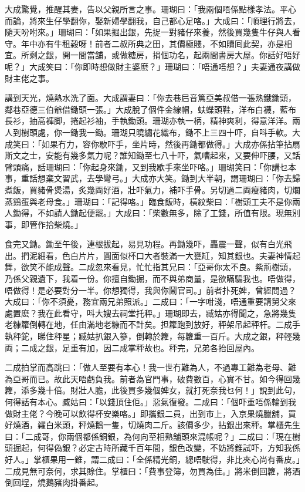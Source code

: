 \documentclass[a5paper, 12pt, openany]{book} %
\begin{document}
	大成驚覺，推醒其妻，告以父親所言之事。珊瑚曰：「我兩個唔係點樣孝法。平心而論，將來生仔學翻你，娶新婦學翻我，自己都心足咯。」大成曰：「順理行將去，隨天吩咐來。」珊瑚曰：「如果掘出銀，先捉一對豬仔來養，然後買幾隻牛仔與人看守。年中亦有牛租穀呀！前者二叔所典之田，其價極賤，不如贖囘此契，亦是相宜。所剩之銀，開一間當舖，或做糖房，捐個功名，起兩間書房大屋。你話好唔好呢？」大成笑曰：「你即時想做財主婆麽？」珊瑚曰：「唔通唔想？」夫妻通夜講做財主佬之事。

	講到天光，燒熱水洗了面。大成謂妻曰：「你去巷𡰪音篤亞美叔借一張熟鐵鋤頭，鄰巷亞德三伯爺借鋤頭一張。」大成脫了個件金線帽，蚨蝶頭鞋，洋布白襪，藍布長衫，抽高褲脚，捲起衫袖，手執鋤頭。珊瑚亦執一柄，精神爽利，得意洋洋。兩人到樹頭處，你一鋤我一鋤。珊瑚只曉繡花織布，鋤不上三四十吓，自呌手軟。大成笑曰：「如果冇力，容你歇吓手，坐片時，然後再鋤都做得。」大成亦係拈筆拈扇斯文之士，安能有幾多氣力呢？誰知鋤至七八十吓，氣嘈起來，又要伸吓腰，又話臂頭痛，話珊瑚曰：「你起身來鋤，又到我歇手來坐吓咯。」珊瑚笑曰：「你講乜本事，重話想棄文習武，去學彎弓。」大成亦大笑。鋤到大半朝，謂珊瑚曰：「你去歸煮飯，買豬骨煲湯，炙幾両好酒，壯吓氣力，補吓手骨。另切過二両瘦豬肉，切爛蒸鷄蛋與老母食。」珊瑚曰：「記得咯。」臨食飯時，橫紋柴曰：「樹頭工夫不是你兩人鋤得，不如請人鋤起便罷。」大成曰：「柴數無多，除了工錢，所值有限。現無別事，即管作拾柴燒。」

	食完又鋤。鋤至午後，連根拔起，易見功程。再鋤幾吓，轟震一聲，似有白光飛出。捫泥細看，色白片片，圓面似杯口大者裝滿一大甕缸，知其銀也。夫妻神情起舞，欲笑不能成聲。二成忽來看見，忙忙指其兄曰：「亞哥你太不良。紫荊樹頭，乃係父親遺下，我着一份。你擅自鋤掘，而不與弟商量，是欲瞞騙我也。唔做得，唔做得！是必要對分一半。你想獨得，我與你鬧官司。」前者扑死婢，曾經問過？大成曰：「你不須憂，務宜兩兄弟照派。」二成曰：「一字咁淺，唔通重要請舅父來處置麽？我在此看守，呌大嫂去祠堂托秤。」珊瑚即去，臧姑亦得聞之，急將幾隻老糠籮倒轉在地，任由滿地老糠而不計矣。担籮跑到放好，秤架吊起秤杆。二成手執秤鉈，睇住秤星；臧姑扒銀入篸，倒轉於籮，每籮重一百斤。大成之銀，秤輕幾両；二成之銀，足重有加，因二成掌秤故也。秤完，兄弟各抬回屋內。

	二成拍掌而高跳曰：「做人至要有本心！我一世冇難為人，不過專工難為老母、難為亞哥而已。故此天唔虧負我。前者為官門事，破費數百，心實不甘。如今得回幾籮，添多幾十倍。財壯人膽，此後買多幾個婢女，就打死奈我乜何！」說到此句，何得話有本心。臧姑曰：「以錢頂住佢。」惡氣復發。二成曰：「個吓重唔係輪到我做財主佬？今晚可以飲得杯安樂咯。」即攜銀二員，出到市上，入京果燒臘舖，買好燒酒，糴白米頭，秤燒鵝一隻，切燒肉二斤。該價多少，拈銀出來秤。掌櫃先生曰：「二成哥，你兩個都係銅銀，為何向至相熟舖頭來混帳呢？」二成曰：「現在樹頭掘起，何得偽銀？必定古時所藏千百年間，銀色改變，不妨將錐試吓，方知我係好人。」掌櫃果用一錐，謂二成曰：「全係精光銅，總唔駛得，非比夾心尚有番皮。」二成見無可奈何，求其賒住。掌櫃曰：「費事登簿，勿買為佳。」將米倒回籮，將酒倒回埕，燒鵝豬肉掛番起。
\end{document}
